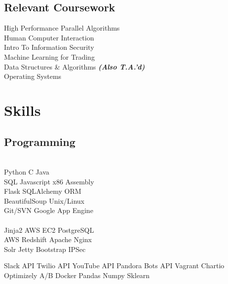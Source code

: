 \documentclass[]{deedy-resume-openfont}
\begin{document}
\begin{minipage}[t]{0.31\textwidth}
\subsection{Relevant Coursework}
High Performance Parallel Algorithms \\
Human Computer Interaction \\
Intro To Information Security \\
Machine Learning for Trading \\
Data Structures \& Algorithms {\footnotesize \textit{\textbf{(Also T.A.'d) }}} \\
Operating Systems
\\[1\baselineskip]


\section{Skills}
\subsection{Programming}
\\[1\baselineskip]

Python \textbullet{}     C     \textbullet{} Java  
\\[1\baselineskip]

SQL \textbullet{} Javascript \textbullet{} x86 Assembly
\\[1\baselineskip]

Flask \textbullet{} SQLAlchemy ORM \\
\textbullet{} BeautifulSoup \textbullet{} Unix/Linux \\ 
Git/SVN \textbullet{} Google App Engine \\
\\[1\baselineskip]
Jinja2  \textbullet{} AWS EC2 \textbullet{} PostgreSQL \\
AWS Redshift \textbullet{} Apache \textbullet{} Nginx\\ 
Solr \textbullet{} Jetty \textbullet{} Bootstrap \textbullet{} IPSec
\sectionsep

  Slack API \textbullet{} Twilio API \textbullet{} YouTube API 
  Pandora Bots API \textbullet{}  Vagrant \textbullet{} Chartio 
  Optimizely A/B \textbullet{} Docker \textbullet{} Pandas 
  Numpy \textbullet{} Sklearn
\sectionsep
\\[1\baselineskip]


\end{minipage}
\end{document}
